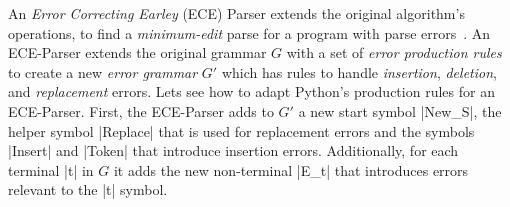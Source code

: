 %

%
An \emph{Error Correcting Earley} (ECE) Parser
extends the original algorithm's operations,
to find a \emph{minimum-edit} parse for a program
with parse errors~\citep{Aho_1972}.
%
An ECE-Parser extends the original grammar $G$
with a set of \emph{error production rules} to
create a new \emph{error grammar} $G'$ which has
rules to handle \emph{insertion}, \emph{deletion},
and \emph{replacement} errors.
%
Lets see how to adapt Python's
production rules for an ECE-Parser.
%
First, the ECE-Parser adds to $G'$ a new start symbol |New_S|, the helper
symbol |Replace| that is used for replacement errors and the symbols |Insert|
and |Token| that introduce insertion errors. Additionally, for each terminal |t|
in $G$ it adds the new non-terminal |E_t| that introduces errors relevant to the
|t| symbol.

